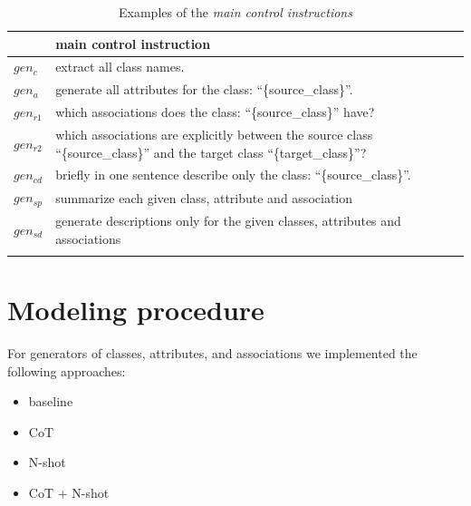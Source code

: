 \begin{table}[!h]
    \scriptsize
    \centering
    \setlength{\tabcolsep}{0.5em}
\begin{tabular}{@{}l>{\raggedright\arraybackslash}p{}>{\raggedright\arraybackslash}p{}@{}}
         & main control instruction \\
    \toprule
    \addlinespace
    
$gen_c$ & extract all class names. \\
\addlinespace

$gen_a$ & generate all attributes for the class: ``\{source\_class\}''. \\
\addlinespace

$gen_{r1}$ & which associations does the class: ``\{source\_class\}'' have? \\
\addlinespace

$gen_{r2}$ & which associations are explicitly between the source class ``\{source\_class\}'' and the target class ``\{target\_class\}''? \\
\addlinespace

$gen_{cd}$ & briefly in one sentence describe only the class: ``\{source\_class\}''. \\
\addlinespace

$gen_{sp}$ & summarize each given class, attribute and association \\
\addlinespace

$gen_{sd}$ & generate descriptions only for the given classes, attributes and associations \\
\addlinespace

	\bottomrule
	\addlinespace
	\end{tabular}
	\caption{Examples of the \emph{main control instructions}}
	\label{tab:main_control_instructions}
\end{table}


\section{Modeling procedure}

For generators of classes, attributes, and associations we implemented the following approaches:

\begin{itemize}
\item baseline
\item CoT
\item N-shot
\item CoT + N-shot
\end{itemize}

